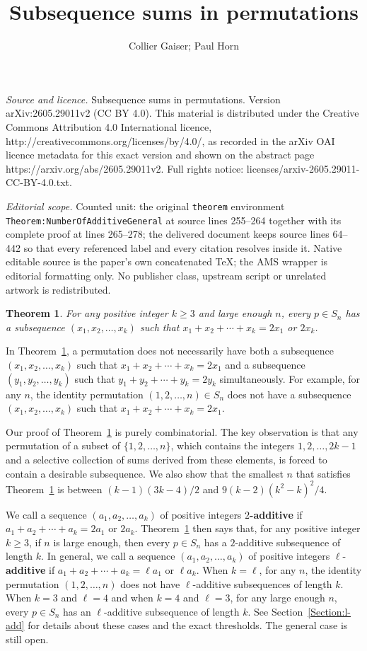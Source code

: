\documentclass[10pt,a4paper]{amsart}
\newtheorem{theorem}{Theorem}[section]
\begin{document}
\title[Subsequence sums in permutations]{Subsequence sums in permutations}
\author{Collier Gaiser; Paul Horn}
\date{}
\maketitle
\noindent\emph{Source and licence.} Subsequence sums in permutations. Version arXiv:2605.29011v2 (CC BY 4.0). This material is distributed under the Creative Commons Attribution 4.0 International licence, http://creativecommons.org/licenses/by/4.0/, as recorded in the arXiv OAI licence metadata for this exact version and shown on the abstract page https://arxiv.org/abs/2605.29011v2. Full rights notice: licenses/arxiv-2605.29011-CC-BY-4.0.txt.\par\smallskip
\noindent\textit{Editorial scope.} Counted unit: the original \texttt{theorem} environment \texttt{Theorem:NumberOfAdditiveGeneral} at source lines 255--264 together with its complete proof at lines 265--278; the delivered document keeps source lines 64--442 so that every referenced label and every citation resolves inside it. Native editable source is the paper's own concatenated TeX; the AMS wrapper is editorial formatting only. No publisher class, upstream script or unrelated artwork is redistributed.
\begin{theorem}\label{Theorem:Main}
    For any positive integer $k\geq3$ and large enough $n$, every $p\in S_n$ has a subsequence $(x_1,x_2,\ldots,x_k)$ such that $x_1+x_2+\cdots+x_k=2 x_1$ or $2x_k$.
\end{theorem}
In Theorem~\ref{Theorem:Main}, a permutation does not necessarily have both a subsequence $(x_1,x_2,\ldots,x_k)$ such that $x_1+x_2+\cdots+x_k=2 x_1$ and a subsequence $(y_1,y_2,\ldots,y_k)$ such that $y_1+y_2+\cdots+y_k=2 y_k$ simultaneously. For example, for any $n$, the identity permutation $(1,2,\ldots,n)\in S_n$ does not have a subsequence $(x_1,x_2,\ldots,x_k)$ such that $x_1+x_2+\cdots+x_k=2 x_1$. 

Our proof of Theorem~\ref{Theorem:Main} is purely combinatorial. The key observation is that any permutation of a subset of $\{1,2,\ldots,n\}$, which contains the integers $1,2,\ldots,2k-1$ and a selective collection of sums derived from these elements, is forced to contain a desirable subsequence. We also show that the smallest $n$ that satisfies Theorem~\ref{Theorem:Main} is between $(k-1)(3k-4)/2$ and $9(k-2)(k^2-k)^2/4$. 

We call a sequence $(a_1,a_2,\ldots,a_k)$ of positive integers \textbf{$2$-additive} if $a_1+a_2+\cdots+a_k=2a_1$ or $2a_k$. Theorem~\ref{Theorem:Main} then says that, for any positive integer $k\geq3$, if $n$ is large enough, then every $p\in S_n$ has a $2$-additive subsequence of length $k$. In general, we call a sequence $(a_1,a_2,\ldots,a_k)$  of positive integers $\ell$-\textbf{additive} if $a_1+a_2+\cdots+a_k=\ell a_1$ or $\ell a_k$. When $k=\ell$, for any $n$, the identity permutation $(1,2,\ldots,n)$ does not have $\ell$-additive subsequences of length $k$. When $k=3$ and $\ell=4$ and when $k=4$ and $\ell=3$, for any large enough $n$, every $p\in S_n$ has an $\ell$-additive subsequence of length $k$. See Section~\ref{Section:l-add} for details about these cases and the exact thresholds. The general case is still open.
\end{document}
